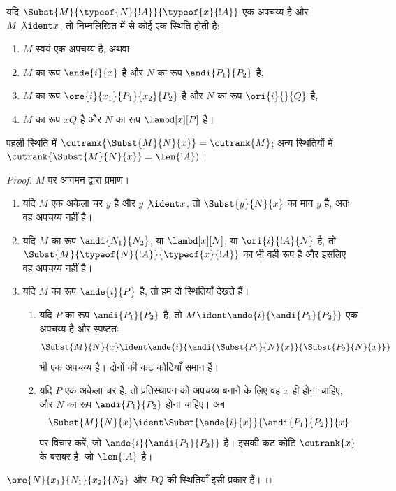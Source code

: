 \documentclass[../../../include/open-logic-section]{subfiles}
\begin{document}
\begin{lem}
  यदि $\Subst{M}{\typeof{N}{!A}}{\typeof{x}{!A}}$ एक अपचय्य है और $M
  \not\ident x$, तो निम्नलिखित में से कोई एक स्थिति होती है:
  \begin{enumerate}
  \item $M$ स्वयं एक अपचय्य है, अथवा
  \item $M$ का रूप $\ande{i}{x}$ है और $N$ का रूप
    $\andi{P_1}{P_2}$ है,
  \item $M$ का रूप $\ore{i}{x_1}{P_1}{x_2}{P_2}$ है और $N$ का रूप
    $\ori{i}{}{Q}$ है,
  \item $M$ का रूप $x Q$ है और $N$ का रूप
    $\lambd[x][P]$ है।
  \end{enumerate}
  पहली स्थिति में $\cutrank{\Subst{M}{N}{x}} = \cutrank{M}$; अन्य
  स्थितियों में $\cutrank{\Subst{M}{N}{x}} = \len{!A})$।
\end{lem}
\begin{proof}
  $M$ पर आगमन द्वारा प्रमाण।
  \begin{enumerate}
  \item यदि $M$ एक अकेला चर $y$ है और $y \not\ident x$, तो
    $\Subst{y}{N}{x}$ का मान $y$ है, अतः वह अपचय्य नहीं है।
  \item यदि $M$ का रूप $\andi{N_1}{N_2}$, या $\lambd[x][N]$, या
    $\ori{i}{!A}{N}$ है, तो $\Subst{M}{\typeof{N}{!A}}{\typeof{x}{!A}}$
    का भी वही रूप है और इसलिए वह अपचय्य नहीं है।
  \item यदि $M$ का रूप $\ande{i}{P}$ है, तो हम दो स्थितियाँ देखते हैं।
    \begin{enumerate}
      \item यदि $P$ का रूप $\andi{P_1}{P_2}$ है, तो $M \ident
        \ande{i}{\andi{P_1}{P_2}}$ एक अपचय्य है और स्पष्टतः
        \[
        \Subst{M}{N}{x} \ident
        \ande{i}{\andi{\Subst{P_1}{N}{x}}{\Subst{P_2}{N}{x}}}
        \]
        भी एक अपचय्य है। दोनों की कट कोटियाँ समान हैं।
      \item यदि $P$ एक अकेला चर है, तो प्रतिस्थापन को अपचय्य बनाने के लिए
        वह $x$ ही होना चाहिए, और $N$ का रूप $\andi{P_1}{P_2}$ होना चाहिए।
        अब
        \[
        \Subst{M}{N}{x} \ident \Subst{\ande{i}{x}}{\andi{P_1}{P_2}}{x}
        \]
        पर विचार करें, जो $\ande{i}{\andi{P_1}{P_2}}$ है। इसकी कट कोटि
        $\cutrank{x}$ के बराबर है, जो $\len{!A}$ है।
    \end{enumerate}
  \end{enumerate}
  $\ore{N}{x_1}{N_1}{x_2}{N_2}$ और $P Q$ की स्थितियाँ इसी प्रकार हैं।
\end{proof}
\end{document}
